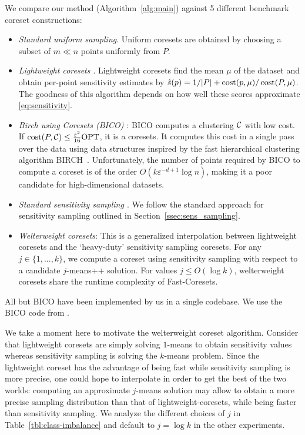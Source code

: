 We compare our method (Algorithm~\ref{alg:main}) against 5 different benchmark coreset constructions:
\begin{itemize}
        \item \emph{Standard uniform sampling}. Uniform coresets are obtained by choosing a subset of $m \ll n$ points uniformly from $P$.
        \item \emph{Lightweight coresets \cite{bachem2018scalable}}. Lightweight coresets find the mean $\mu$ of the dataset and obtain per-point sensitivity estimates by $\hat{s}(p) = 1/|P| + \operatorname{cost}(p, \mu) / \operatorname{cost}(P, \mu)$. The goodness of this algorithm depends on how well these scores approximate \cref{eq:sensitivity}.
        \item \emph{Birch using Coresets (BICO) \cite{bico}}: BICO computes a clustering $\mathcal C$ with low cost. If $\operatorname{cost}(P,\mathcal C)\leq \frac{\varepsilon^2}{16} \text{OPT}$, it is a coresets. It computes this cost in a single pass over the data using data structures inspired by the fast hierarchical clustering algorithm BIRCH~\cite{birch}. Unfortunately, the number of points required by BICO to compute a coreset is of the order $O(k \varepsilon^{-d+1}\log n)$, making it a poor candidate for high-dimensional datasets.
        \item \emph{Standard sensitivity sampling \cite{LS10}}. We follow the standard approach for sensitivity sampling outlined in Section~\ref{ssec:sens_sampling}.
        \item \emph{Welterweight coresets}: This is a generalized interpolation between lightweight coresets and the `heavy-duty' sensitivity sampling coresets. For any $j
            \in \{1,..., k\}$, we compute a coreset using sensitivity sampling with respect to a candidate $j$-means++ solution. For values $j \leq O(\log k)$,
            welterweight coresets share the runtime complexity of Fast-Coresets.
\end{itemize}
All but BICO have been implemented by us in a single codebase. We use the BICO code from \cite{bico}.

We take a moment here to motivate the welterweight coreset algorithm.  Consider that lightweight coresets are simply solving $1$-means to obtain sensitivity
values whereas sensitivity sampling is solving the $k$-means problem. Since the lightweight coreset has the advantage of being fast while sensitivity sampling
is more precise, one could hope to interpolate in order to get the best of the two worlds: computing an approximate $j$-means solution may allow to obtain
a more precise sampling distribution than that of lightweight-coresets, while being faster than sensitivity sampling. We analyze the different choices of $j$ in
Table~\ref{tbl:class-imbalance} and default to $j = \log k$ in the other experiments.

